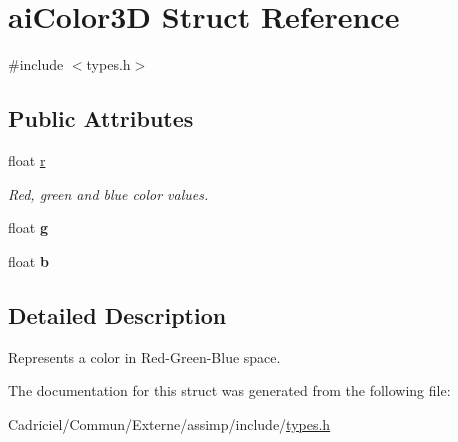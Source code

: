\hypertarget{structai_color3_d}{}\section{ai\+Color3D Struct Reference}
\label{structai_color3_d}


{\ttfamily \#include $<$types.\+h$>$}

\subsection*{Public Attributes}
\begin{DoxyCompactItemize}
\item 
float \hyperlink{structai_color3_d_a0ff704458aa26c84bbfe93b2dd89c630}{r}\hypertarget{structai_color3_d_a0ff704458aa26c84bbfe93b2dd89c630}{}\label{structai_color3_d_a0ff704458aa26c84bbfe93b2dd89c630}

\begin{DoxyCompactList}\small\item\em Red, green and blue color values. \end{DoxyCompactList}\item 
float {\bfseries g}\hypertarget{structai_color3_d_a40ecdcee92b5373cbaa5e00ebcdb2cfb}{}\label{structai_color3_d_a40ecdcee92b5373cbaa5e00ebcdb2cfb}

\item 
float {\bfseries b}\hypertarget{structai_color3_d_a02ddcc7af11f7d4d6ea14f1bfb4ef6c7}{}\label{structai_color3_d_a02ddcc7af11f7d4d6ea14f1bfb4ef6c7}

\end{DoxyCompactItemize}


\subsection{Detailed Description}
Represents a color in Red-\/\+Green-\/\+Blue space. 

The documentation for this struct was generated from the following file\+:\begin{DoxyCompactItemize}
\item 
Cadriciel/\+Commun/\+Externe/assimp/include/\hyperlink{types_8h}{types.\+h}\end{DoxyCompactItemize}

